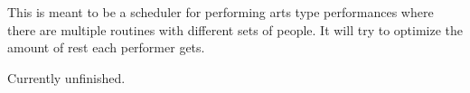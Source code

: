 This is meant to be a scheduler for performing arts type performances where there are multiple routines with different sets of people. It will try to optimize the amount of rest each performer gets.

Currently unfinished. 